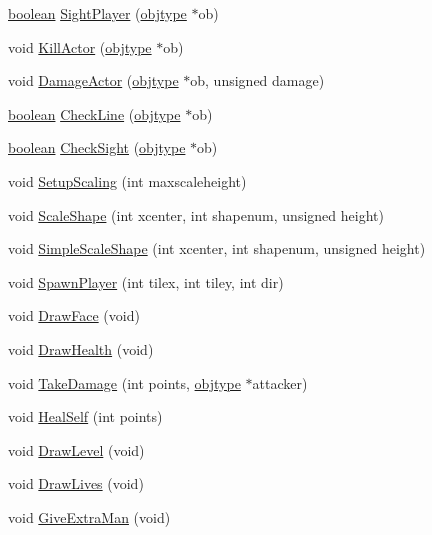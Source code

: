 \begin{DoxyCompactItemize}
\hyperlink{ID__HEAD_8H_a7c6368b321bd9acd0149b030bb8275ed}{boolean} \hyperlink{WL__DEF_8H_a3a43f9647b8793707a682d5507017ecd}{SightPlayer} (\hyperlink{structobjstruct}{objtype} $\ast$ob)
\item 
void \hyperlink{WL__DEF_8H_ab414c5cb884ce9d89439a787a5b8c8de}{KillActor} (\hyperlink{structobjstruct}{objtype} $\ast$ob)
\item 
void \hyperlink{WL__DEF_8H_a0dd7c0f5423efb70928fd80fa08e013a}{DamageActor} (\hyperlink{structobjstruct}{objtype} $\ast$ob, unsigned damage)
\item 
\hyperlink{ID__HEAD_8H_a7c6368b321bd9acd0149b030bb8275ed}{boolean} \hyperlink{WL__DEF_8H_ad9ba23a7cef5028a4aafaa790c89ef9e}{CheckLine} (\hyperlink{structobjstruct}{objtype} $\ast$ob)
\item 
\hyperlink{ID__HEAD_8H_a7c6368b321bd9acd0149b030bb8275ed}{boolean} \hyperlink{WL__DEF_8H_a78d1b5b5a62255da160d304dedbe2eae}{CheckSight} (\hyperlink{structobjstruct}{objtype} $\ast$ob)
\item 
void \hyperlink{WL__DEF_8H_a4604aaa0f82797a8a88e59394a3bef9e}{SetupScaling} (int maxscaleheight)
\item 
void \hyperlink{WL__DEF_8H_ac4e07b4cd66c3fa71e9f675325f5e8ca}{ScaleShape} (int xcenter, int shapenum, unsigned height)
\item 
void \hyperlink{WL__DEF_8H_a11d04052928f61aec9102f6cce71fadb}{SimpleScaleShape} (int xcenter, int shapenum, unsigned height)
\item 
void \hyperlink{WL__DEF_8H_a4bc0a75c89b1b52cf115c63b5c07ff9c}{SpawnPlayer} (int tilex, int tiley, int dir)
\item 
void \hyperlink{WL__DEF_8H_a8be593acb7e02c668d964d6042679fde}{DrawFace} (void)
\item 
void \hyperlink{WL__DEF_8H_a72c88545eb3ce65cd96f2af4d7704f42}{DrawHealth} (void)
\item 
void \hyperlink{WL__DEF_8H_a383b7b6dc8f0fe10dde5eeaeeb0e9b76}{TakeDamage} (int points, \hyperlink{structobjstruct}{objtype} $\ast$attacker)
\item 
void \hyperlink{WL__DEF_8H_ad7b857c66f0f0e7bc7b961a9d2024538}{HealSelf} (int points)
\item 
void \hyperlink{WL__DEF_8H_ae76d82b105193ca17991c489b709b57f}{DrawLevel} (void)
\item 
void \hyperlink{WL__DEF_8H_aefc0a3d13bbeb119a08400ef0217dfb6}{DrawLives} (void)
\item 
void \hyperlink{WL__DEF_8H_acb68c87a8a1dbcc48e7009f56d1dc7fe}{GiveExtraMan} (void)
\item 

\end{DoxyCompactItemize}
